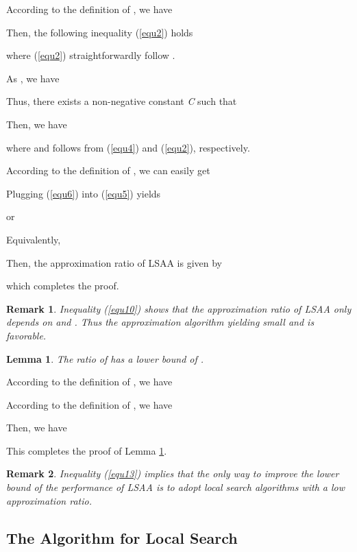 \documentclass[journal]{IEEEtran}
\newtheorem{lemma}{Lemma}
\newtheorem{remark}{Remark}
\begin{document}
\begin{IEEEproof}
According to the definition of , we have

Then, the following inequality (\ref{equ2}) holds

where (\ref{equ2}) straightforwardly follow .

As , we have

Thus, there exists a non-negative constant \emph{C} such that

Then, we have

where  and  follows from (\ref{equ4}) and (\ref{equ2}), respectively.

According to the definition of , we can easily get


Plugging (\ref{equ6}) into (\ref{equ5}) yields

or

Equivalently,

Then, the approximation ratio of LSAA is given by

which completes the proof.
\end{IEEEproof}

\begin{remark} Inequality (\ref{equ10}) shows that the approximation ratio of LSAA only depends on  and . Thus the approximation algorithm yielding small  and  is favorable.
\end{remark}
\begin{lemma}\label{lemma2}
The ratio of  has a lower bound of .
\end{lemma}

\begin{IEEEproof}
According to the definition of , we have



According to the definition of , we have



Then, we have


This completes the proof of Lemma \ref{lemma2}.
\end{IEEEproof}

\begin{remark}
Inequality (\ref{equ13}) implies that the only way to improve the lower bound of the performance of LSAA is to adopt local search algorithms with a low approximation ratio.
\end{remark}
\subsection{The Algorithm for Local Search}
\end{document}
